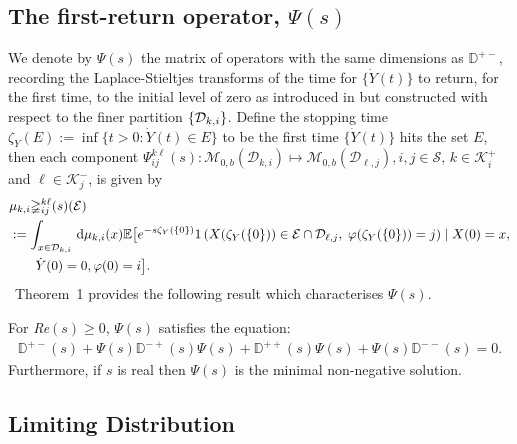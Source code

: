 \subsection{The first-return operator, $\mathbb\Psi(s)$}\label{sec: intro Psi}
We denote by $\mathbb \Psi(s)$ the matrix of operators with the same dimensions as \(\mathbb D^{+-}\), recording the Laplace-Stieltjes transforms of the time for $\{\dot Y(t)\}$ to return, for the first time, to the initial level of zero as introduced in \cite{bo2014} but constructed with respect to the finer partition \(\{\mathcal{D}_{k,i}\}\). Define the stopping time $\zeta_Y(E):= \inf \{t > 0: \dot Y(t) \in E\}$ to be the first time $\{\dot Y(t)\}$ hits the set $E$, then each component $\mathbb \Psi_{ij}^{k\ell}(s): \mathcal{M}_{0,b}(\mathcal D_{k,i}) \mapsto \mathcal{M}_{0,b}(\mathcal D_{\ell,j}), i,j \in \mathcal{S},\,k\in\mathcal K_i^+$ and $\ell \in \mathcal K_j^-$, is given by  
% 
\begin{align*} 
	&\mu_{k,i}\mathbb\Psi_{ij}^{k\ell}(s) (\mathcal{E}) 
	\\& := \int_{x \in \mathcal{D}_{k,i}} \, \mathrm{d} \mu_{k,i}(x)
	 \mathbb{E}\big[e^{-s\zeta_Y(\{0\})}1\left(X({\zeta_Y(\{0\})}) \in \mathcal{E}\cap\mathcal{D}_{\ell,j},\; \varphi({\zeta_Y(\{0\})}) = j \right) \mid X(0) = x, 
	 \\&\qquad{} \dot Y(0) = 0, \varphi(0) = i\big].
\end{align*} 
\cite{bo2014}~Theorem~1 provides the following result which characterises \(\mathbb\Psi(s)\).
\begin{theo} 
	\label{theo:Psi} 
	For \textit{Re}$(s) \geq 0$, $\mathbb\Psi(s)$ satisfies the  equation: 
	\begin{align*} 
		\mathbb{D}^{+-}(s) + \mathbb\Psi(s)\mathbb{D}^{-+}(s)\mathbb\Psi(s) + \mathbb{D}^{++}(s)\mathbb\Psi(s) + \mathbb\Psi(s)\mathbb{D}^{--}(s) = 0. 
	\end{align*} 
	Furthermore, if $s$ is real then $\mathbb\Psi(s)$ is the minimal non-negative solution. 
\end{theo} 

\subsection{Limiting Distribution} 

